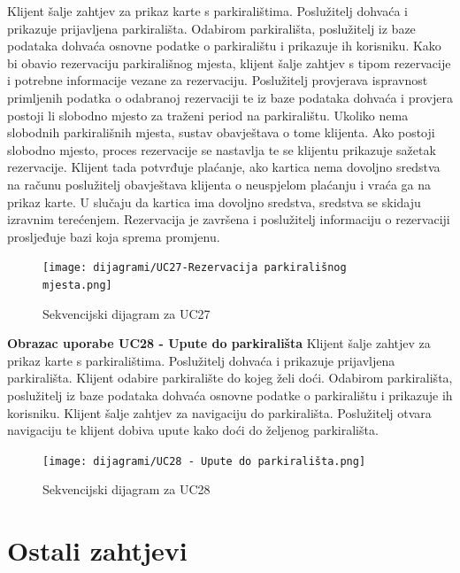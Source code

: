 Klijent šalje zahtjev za prikaz karte s parkiralištima. Poslužitelj dohvaća i prikazuje prijavljena parkirališta. Odabirom parkirališta, poslužitelj iz baze podataka dohvaća osnovne podatke o parkiralištu i prikazuje ih korisniku. Kako bi obavio rezervaciju parkirališnog mjesta, klijent šalje zahtjev s tipom rezervacije i potrebne informacije vezane za rezervaciju. Poslužitelj provjerava ispravnost primljenih podatka o odabranoj rezervaciji te iz baze podataka dohvaća i provjera postoji li slobodno mjesto za traženi period na parkiralištu. Ukoliko nema slobodnih parkirališnih mjesta, sustav obavještava o tome klijenta. Ako postoji slobodno mjesto, proces rezervacije se nastavlja te se klijentu prikazuje sažetak rezervacije. Klijent tada potvrđuje plaćanje, ako kartica nema dovoljno sredstva na računu poslužitelj obavještava klijenta o neuspjelom plaćanju i vraća ga na prikaz karte. U slučaju da kartica ima dovoljno sredstva, sredstva se skidaju izravnim terećenjem. Rezervacija je završena i poslužitelj informaciju o rezervaciji prosljeđuje bazi koja sprema promjenu.\newline
\begin{figure}[H]
	\texttt{[image: dijagrami/UC27-Rezervacija parkirališnog mjesta.png]} %
	\caption{Sekvencijski dijagram za UC27}
	\label{fig:promjene2} %
\end{figure}
\pagebreak
\textbf{Obrazac uporabe UC28 - Upute do parkirališta}\newline
Klijent šalje zahtjev za prikaz karte s parkiralištima. Poslužitelj dohvaća i prikazuje prijavljena parkirališta. Klijent odabire parkiralište do kojeg želi doći. Odabirom parkirališta, poslužitelj iz baze podataka dohvaća osnovne podatke o parkiralištu i prikazuje ih korisniku. Klijent šalje zahtjev za navigaciju do parkirališta. Poslužitelj otvara navigaciju te klijent dobiva upute kako doći do željenog parkirališta.
\begin{figure}[H]
	\texttt{[image: dijagrami/UC28 - Upute do parkirališta.png]} %
	\caption{Sekvencijski dijagram za UC28}
	\label{fig:promjene2} %
\end{figure}
\eject

\section{Ostali zahtjevi}

